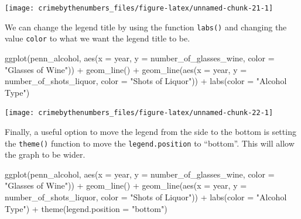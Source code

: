 \documentclass[
]{krantz}
\makeatletter
\newenvironment{Shaded}{\begin{snugshade}}{\end{snugshade}}
\newcommand{\AttributeTok}[1]{\textcolor[rgb]{0.61,0.61,0.61}{#1}}
\newcommand{\FunctionTok}[1]{\textcolor[rgb]{0,0,0}{#1}}
\newcommand{\NormalTok}[1]{#1}
\newcommand{\SpecialCharTok}[1]{\textcolor[rgb]{0,0,0}{#1}}
\newcommand{\StringTok}[1]{\textcolor[rgb]{0.5,0.5,0.5}{#1}}
\newenvironment{kframe}{%
\medskip{}
\setlength{\fboxsep}{.8em}
 \def\at@end@of@kframe{}%
 \ifinner\ifhmode%
  \def\at@end@of@kframe{\end{minipage}}%
  \begin{minipage}{\columnwidth}%
 \fi\fi%
 \def\FrameCommand##1{\hskip\@totalleftmargin \hskip-\fboxsep
 \colorbox{shadecolor}{##1}\hskip-\fboxsep
     \hskip-\linewidth \hskip-\@totalleftmargin \hskip\columnwidth}%
 \MakeFramed {\advance\hsize-\width
   \@totalleftmargin\z@ \linewidth\hsize
   \@setminipage}}%
 {\par\unskip\endMakeFramed%
 \at@end@of@kframe}
\renewenvironment{Shaded}{\begin{kframe}}{\end{kframe}}
\makeatother
\begin{document}
\begin{center}\texttt{[image: crimebythenumbers\_files/figure-latex/unnamed-chunk-21-1]} \end{center}

We can change the legend title by using the function \texttt{labs()} and changing the value \texttt{color} to what we want the legend title to be.

\begin{Shaded}
\begin{Highlighting}[]
\FunctionTok{ggplot}\NormalTok{(penn\_alcohol, }\FunctionTok{aes}\NormalTok{(}\AttributeTok{x =}\NormalTok{ year, }\AttributeTok{y =}\NormalTok{ number\_of\_glasses\_wine,}
  \AttributeTok{color =} \StringTok{"Glasses of Wine"}\NormalTok{)) }\SpecialCharTok{+} \FunctionTok{geom\_line}\NormalTok{() }\SpecialCharTok{+} \FunctionTok{geom\_line}\NormalTok{(}\FunctionTok{aes}\NormalTok{(}\AttributeTok{x =}\NormalTok{ year,}
  \AttributeTok{y =}\NormalTok{ number\_of\_shots\_liquor, }\AttributeTok{color =} \StringTok{"Shots of Liquor"}\NormalTok{)) }\SpecialCharTok{+}
  \FunctionTok{labs}\NormalTok{(}\AttributeTok{color =} \StringTok{"Alcohol Type"}\NormalTok{)}
\end{Highlighting}
\end{Shaded}

\begin{center}\texttt{[image: crimebythenumbers\_files/figure-latex/unnamed-chunk-22-1]} \end{center}

Finally, a useful option to move the legend from the side to the bottom is setting the \texttt{theme()} function to move the \texttt{legend.position} to ``bottom''. This will allow the graph to be wider.

\begin{Shaded}
\begin{Highlighting}[]
\FunctionTok{ggplot}\NormalTok{(penn\_alcohol, }\FunctionTok{aes}\NormalTok{(}\AttributeTok{x =}\NormalTok{ year, }\AttributeTok{y =}\NormalTok{ number\_of\_glasses\_wine,}
  \AttributeTok{color =} \StringTok{"Glasses of Wine"}\NormalTok{)) }\SpecialCharTok{+} \FunctionTok{geom\_line}\NormalTok{() }\SpecialCharTok{+} \FunctionTok{geom\_line}\NormalTok{(}\FunctionTok{aes}\NormalTok{(}\AttributeTok{x =}\NormalTok{ year,}
  \AttributeTok{y =}\NormalTok{ number\_of\_shots\_liquor, }\AttributeTok{color =} \StringTok{"Shots of Liquor"}\NormalTok{)) }\SpecialCharTok{+}
  \FunctionTok{labs}\NormalTok{(}\AttributeTok{color =} \StringTok{"Alcohol Type"}\NormalTok{) }\SpecialCharTok{+} \FunctionTok{theme}\NormalTok{(}\AttributeTok{legend.position =} \StringTok{"bottom"}\NormalTok{)}
\end{Highlighting}
\end{Shaded}
\end{document}
